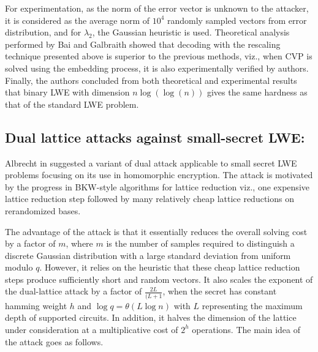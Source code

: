 For experimentation, as the norm of the error vector is unknown to the attacker, it is considered as the average norm of $10^4$ randomly sampled vectors from error distribution, and for $\lambda_2$, the Gaussian heuristic is used. Theoretical analysis performed by Bai and Galbraith showed that decoding with the rescaling technique presented above is superior to the previous methods, viz., when CVP is solved using the embedding process, it is also experimentally verified by authors. Finally, the authors concluded from both theoretical and experimental results that binary LWE with dimension $n\log{(\log{(n)})}$ gives the same hardness as that of the standard LWE problem.





\subsection{Dual lattice attacks against small-secret LWE:}
\label{sec:dimension_error_trade_off}
Albrecht in \cite{albrecht2017dual} suggested a variant of dual attack applicable to small secret LWE problems focusing on its use in homomorphic encryption. The attack is motivated by the progress in BKW-style algorithms for
lattice reduction viz.,
one expensive lattice reduction step followed by many relatively cheap lattice reductions on rerandomized bases.

The advantage of the attack is that it essentially reduces the overall solving cost by a factor of $m$, where $m$ is the number of samples required to distinguish a discrete Gaussian distribution with a large standard deviation from uniform modulo $q$.
However, it relies on the heuristic that these cheap lattice reduction steps produce sufficiently short and random vectors. It also scales the exponent of the dual-lattice attack by a factor of $\frac{2L}{(L+1}$, when the secret has constant hamming weight $h$ and $\log {q} = \theta(L\log {n})$ with $L$ representing the maximum depth of supported circuits. In addition, it halves the dimension of the lattice under consideration at a multiplicative cost of $2^h$ operations. The main idea of the attack goes as follows.









